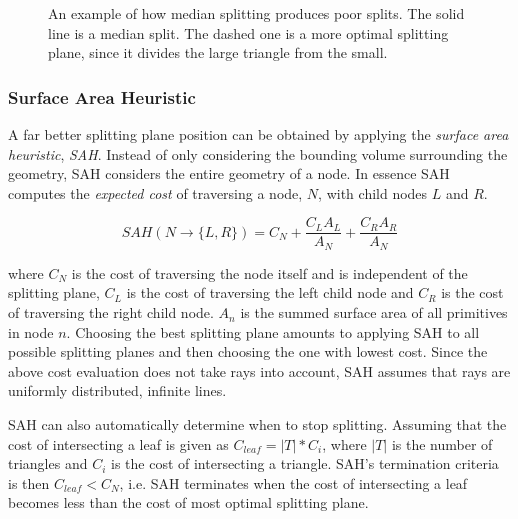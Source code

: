 \begin{figure}
  \centering
  \caption[An example of median splitting producing poor splits.]{An
    example of how median splitting produces poor splits. The solid line
    is a median split. The dashed one is a more optimal splitting
    plane, since it divides the large triangle from the small.}
  \label{fig:crapMedian}
\end{figure}

\subsubsection{Surface Area Heuristic}


A far better splitting plane position can be obtained by applying the
\textit{surface area heuristic}, \textit{SAH}. Instead of only
considering the bounding volume surrounding the geometry, SAH
considers the entire geometry of a node. In essence SAH computes the
\textit{expected cost} of traversing a node, $N$, with child nodes $L$
and $R$.

\begin{displaymath}
  SAH(N \rightarrow \{L, R\}) = C_N + \frac{C_L A_L}{A_N} +
  \frac{C_R A_R}{A_N}
\end{displaymath}

where $C_N$ is the cost of traversing the node itself and is
independent of the splitting plane, $C_L$ is the cost of traversing
the left child node and $C_R$ is the cost of traversing the right
child node. $A_n$ is the summed surface area of all primitives in node
$n$. Choosing the best splitting plane amounts to applying SAH to all
possible splitting planes and then choosing the one with lowest
cost. Since the above cost evaluation does not take rays into account,
SAH assumes that rays are uniformly distributed, infinite lines.

SAH can also automatically determine when to stop splitting. Assuming
that the cost of intersecting a leaf is given as $C_{leaf} = |T| *
C_i$, where $|T|$ is the number of triangles and $C_i$ is the cost of
intersecting a triangle. SAH's termination criteria is then $C_{leaf}
< C_N$, i.e. SAH terminates when the cost of intersecting a leaf
becomes less than the cost of most optimal splitting plane.

